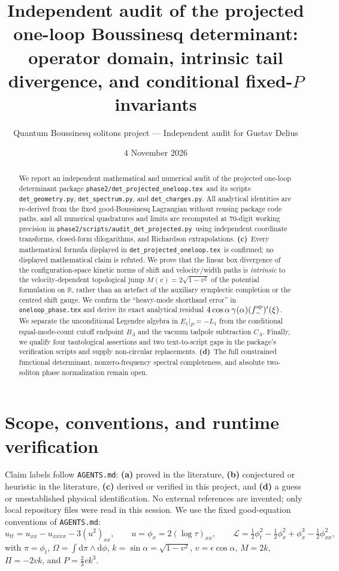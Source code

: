 \documentclass[11pt,a4paper]{article}
\title{Independent audit of the projected one-loop Boussinesq determinant:\\
operator domain, intrinsic tail divergence, and conditional fixed-$P$ invariants}
\author{Quantum Boussinesq solitons project --- Independent audit for Gustav Delius}
\date{4 November 2026}
\newcommand{\Lc}{\textsf{\textbf{(c)}}\ }
\newcommand{\Ld}{\textsf{\textbf{(d)}}\ }
\newcommand{\scr}{\texttt{audit\_\allowbreak det\_\allowbreak projected.py}}
\newcommand{\pkgtex}{\texttt{det\_\allowbreak projected\_\allowbreak oneloop.tex}}
\newcommand{\G}{\texttt{det\_\allowbreak geometry.py}}
\newcommand{\Scheck}{\texttt{det\_\allowbreak spectrum.py}}
\newcommand{\Ccheck}{\texttt{det\_\allowbreak charges.py}}
\newcommand{\dd}{\mathrm d}
\newcommand{\R}{\mathbb R}
\begin{document}
\maketitle

\begin{abstract}
We report an independent mathematical and numerical audit of the projected
one-loop determinant package \texttt{phase2/}\pkgtex\ and its
scripts \G, \Scheck, and \Ccheck. All analytical identities are re-derived from
the fixed good-Boussinesq Lagrangian without reusing package code paths, and all
numerical quadratures and limits are recomputed at 70-digit working precision
in \texttt{phase2/\allowbreak scripts/}\scr\ using independent coordinate transforms,
closed-form dilogarithms, and Richardson extrapolations.
\Lc Every mathematical formula displayed in \pkgtex\ is confirmed; no displayed
mathematical claim is refuted. We prove that the linear box divergence of the
configuration-space kinetic norms of shift and velocity/width paths is
\emph{intrinsic} to the velocity-dependent topological jump $M(v)=2\sqrt{1-v^2}$
of the potential formulation on $\R$, rather than an artefact of the auxiliary
symplectic completion or the centred shift gauge. We confirm the ``heavy-mode
shorthand error'' in \texttt{oneloop\_\allowbreak phase.tex} and derive its exact
analytical residual $4\cos\alpha\,\gamma(\alpha)(f_-^{\rm sp})'(\xi)$.
We separate the unconditional Legendre algebra in $E_1|_P=-L_1$ from the
conditional equal-mode-count cutoff endpoint $B_\Lambda$ and the vacuum
tadpole subtraction $C_\Lambda$. Finally, we qualify four tautological
assertions and two text-to-script gaps in the package's verification scripts
and supply non-circular replacements. \Ld The full constrained functional
determinant, nonzero-frequency spectral completeness, and absolute two-soliton
phase normalization remain open.
\end{abstract}

\section{Scope, conventions, and runtime verification}
Claim labels follow \texttt{AGENTS.md}: \textbf{(a)} proved in the literature,
\textbf{(b)} conjectured or heuristic in the literature, \textbf{(c)} derived or
verified in this project, and \textbf{(d)} a guess or unestablished physical
identification. No external references are invented; only local repository files
were read in this session. We use the fixed good-equation conventions of
\texttt{AGENTS.md}:
\begin{equation}\label{eq:conv}
 u_{tt}=u_{xx}-u_{xxxx}-3(u^2)_{xx},\qquad u=\phi_x=2(\log\tau)_{xx},\qquad
 \mathcal L=\tfrac12\phi_t^2-\tfrac12\phi_x^2+\phi_x^3-\tfrac12\phi_{xx}^2,
\end{equation}
with $\pi=\phi_t$, $\Omega=\int\dd\pi\wedge\dd\phi$, $k=\sin\alpha=\sqrt{1-v^2}$,
$v=\epsilon\cos\alpha$, $M=2k$, $\Pi=-2vk$, and $P=\tfrac23vk^3$.
\end{document}
